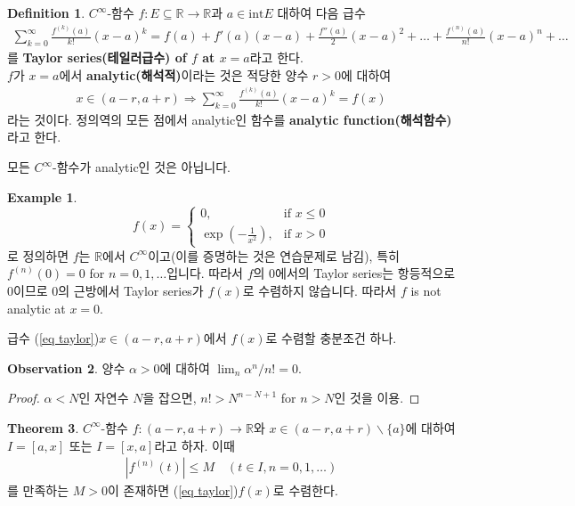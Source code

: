 \documentclass[12pt]{article}
\theoremstyle{definition}
\newtheorem{thm}{Theorem}[section]
\newtheorem{defn}[thm]{Definition}
\newtheorem{obs}[thm]{Observation}
\newtheorem*{ex}{Example}
\def\RR{\mathbb{R}}
\newcommand{\abs}[1]{\left\vert#1\right\vert}
\begin{document}
\begin{defn}
	\(C^\infty\)-함수 \(f: E \subseteq \RR \rightarrow \RR\)과 \(a \in \text{int}E\) 대하여 다음 급수
	\begin{gather*}
		\sum_{k=0}^\infty \frac{f^{(k)}(a)}{k!} (x-a)^k = f(a) + f'(a)(x-a) + \frac{f''(a)}{2} (x-a)^2 + \ldots + \frac{f^{(n)}(a)}{n!} (x-a)^n + \ldots
	\end{gather*}
	를 \textbf{Taylor series(테일러급수) of \(f\) at \(x=a\)}라고 한다.\\
	\(f\)가 \(x=a\)에서 \textbf{analytic(해석적)}이라는 것은 적당한 양수 \(r > 0\)에 대하여
	\begin{gather*}
		x \in (a - r, a + r) \Longrightarrow \sum_{k=0}^\infty \frac{f^{(k)}(a)}{k!} (x-a)^k = f(x)
	\end{gather*}
	라는 것이다. 정의역의 모든 점에서 analytic인 함수를 \textbf{analytic function(해석함수)}라고 한다.
\end{defn}

모든 \(C^\infty\)-함수가 analytic인 것은 아닙니다.

\begin{ex}
	\begin{equation}
		f(x) = 
		\begin{cases}
			0, &\text{if } x \le 0\\
			\exp\left(-\frac{1}{x^2}\right), &\text{if } x > 0
		\end{cases}
	\end{equation}
	로 정의하면 \(f\)는 \(\RR\)에서 \(C^\infty\)이고(이를 증명하는 것은 연습문제로 남김), 특히 \(f^{(n)}(0) = 0\) for \(n = 0, 1, \ldots\)입니다. 따라서 \(f\)의 0에서의 Taylor series는 항등적으로 0이므로 0의 근방에서 Taylor series가 \(f(x)\)로 수렴하지 않습니다. 따라서 \(f\) is not analytic at \(x=0\).
\end{ex}

급수 (\ref{eq taylor})\이 \(x \in (a-r, a+r)\)에서 \(f(x)\)로 수렴할 충분조건 하나.

\begin{obs} \label{obs factorial}
	양수 \(\alpha > 0\)에 대하여 \(\lim_n \alpha^n / n! = 0\).
\end{obs}
\begin{proof}
	\(\alpha < N\)인 자연수 \(N\)을 잡으면, \(n! > N^{n - N + 1}\) for \(n > N\)인 것을 이용.
\end{proof}

\begin{thm}
	\(C^\infty\)-함수 \(f: (a-r, a+r) \rightarrow \RR\)와 \(x \in (a - r, a + r) \backslash \{a\}\)에 대하여 \(I = [a, x]\) 또는 \(I = [x, a]\)라고 하자. 이때
	\begin{gather*}
		\abs{f^{(n)}(t)} \le M \quad (t \in I, n = 0, 1, \ldots)
	\end{gather*}
	를 만족하는 \(M > 0\)이 존재하면 (\ref{eq taylor})\은 \(f(x)\)로 수렴한다.
\end{thm}
\end{document}
